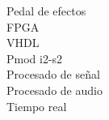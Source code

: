 \begin{multicols}{2}
\noindent Pedal de efectos \\
FPGA \\
VHDL \\
Pmod i2-s2 \\
Procesado de señal \\
Procesado de audio \\
Tiempo real \\

\end{multicols}